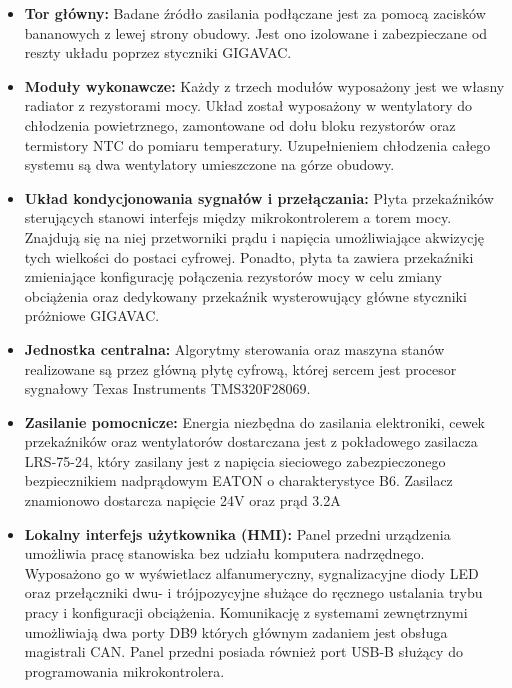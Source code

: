 \begin{itemize}
	\item \textbf{Tor główny:} Badane źródło zasilania podłączane jest za pomocą zacisków bananowych z lewej strony obudowy. Jest ono izolowane i zabezpieczane od reszty układu poprzez styczniki GIGAVAC.
	
	\item \textbf{Moduły wykonawcze:} Każdy z trzech modułów wyposażony jest we własny radiator z rezystorami mocy. Układ został wyposażony w wentylatory do chłodzenia powietrznego, zamontowane od dołu bloku rezystorów oraz termistory NTC do pomiaru temperatury. Uzupełnieniem chłodzenia całego systemu są dwa wentylatory umieszczone na górze obudowy.
	
	\item \textbf{Układ kondycjonowania sygnałów i przełączania:} Płyta przekaźników sterujących stanowi interfejs między mikrokontrolerem a torem mocy. Znajdują się na niej przetworniki prądu i napięcia umożliwiające akwizycję tych wielkości do postaci cyfrowej. Ponadto, płyta ta zawiera przekaźniki zmieniające konfigurację połączenia rezystorów mocy w celu zmiany obciążenia oraz dedykowany przekaźnik wysterowujący główne styczniki próżniowe GIGAVAC.
	
	\item \textbf{Jednostka centralna:} Algorytmy sterowania oraz maszyna stanów realizowane są przez główną płytę cyfrową, której sercem jest procesor sygnałowy Texas Instruments TMS320F28069.
	
	\item \textbf{Zasilanie pomocnicze:}  Energia niezbędna do zasilania elektroniki, cewek przekaźników oraz wentylatorów dostarczana jest z pokładowego zasilacza LRS-75-24, który zasilany jest z napięcia sieciowego zabezpieczonego bezpiecznikiem nadprądowym EATON o charakterystyce B6. Zasilacz znamionowo dostarcza napięcie 24V oraz prąd 3.2A
	
	\item \textbf{Lokalny interfejs użytkownika (HMI):} Panel przedni urządzenia umożliwia pracę stanowiska bez udziału komputera nadrzędnego. Wyposażono go w wyświetlacz alfanumeryczny, sygnalizacyjne diody LED oraz przełączniki dwu- i trójpozycyjne służące do ręcznego ustalania trybu pracy i konfiguracji obciążenia. Komunikację z systemami zewnętrznymi umożliwiają dwa porty DB9 których głównym zadaniem jest obsługa magistrali CAN. Panel przedni posiada również port USB-B służący do programowania mikrokontrolera.
\end{itemize}

